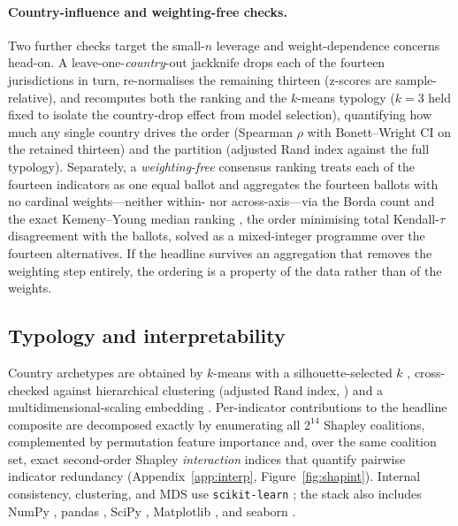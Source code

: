 \documentclass[11pt]{article}
\begin{document}
\paragraph{Country-influence and weighting-free checks.} Two further checks target the small-$n$ leverage and weight-dependence concerns head-on. A leave-one-\emph{country}-out jackknife \citep{quenouille1949approximate,tukey1958bias} drops each of the fourteen jurisdictions in turn, re-normalises the remaining thirteen (z-scores are sample-relative), and recomputes both the ranking and the $k$-means typology ($k=3$ held fixed to isolate the country-drop effect from model selection), quantifying how much any single country drives the order (Spearman $\rho$ with Bonett--Wright CI on the retained thirteen) and the partition (adjusted Rand index against the full typology). Separately, a \emph{weighting-free} consensus ranking treats each of the fourteen indicators as one equal ballot and aggregates the fourteen ballots with no cardinal weights---neither within- nor across-axis---via the Borda count \citep{borda1781memoire} and the exact Kemeny--Young median ranking \citep{kemeny1959mathematics,young1988optimal}, the order minimising total Kendall-$\tau$ disagreement with the ballots, solved as a mixed-integer programme over the fourteen alternatives. If the headline survives an aggregation that removes the weighting step entirely, the ordering is a property of the data rather than of the weights.

\subsection{Typology and interpretability}
Country archetypes are obtained by $k$-means with a silhouette-selected $k$ \citep{rousseeuw1987silhouettes}, cross-checked against hierarchical clustering (adjusted Rand index, \citealp{hubert1985ari}) and a multidimensional-scaling embedding \citep{kruskal1964mds}. Per-indicator contributions to the headline composite are decomposed exactly by enumerating all $2^{14}$ Shapley \citep{shapley1953value} coalitions, complemented by permutation feature importance and, over the same coalition set, exact second-order Shapley \emph{interaction} indices \citep{grabisch1999interaction} that quantify pairwise indicator redundancy (Appendix~\ref{app:interp}, Figure~\ref{fig:shapint}). Internal consistency, clustering, and MDS use \texttt{scikit-learn} \citep{pedregosa2011scikit}; the stack also includes NumPy \citep{harris2020numpy}, pandas \citep{mckinney2010pandas}, SciPy \citep{virtanen2020scipy}, Matplotlib \citep{hunter2007matplotlib}, and seaborn \citep{waskom2021seaborn}.
\end{document}
